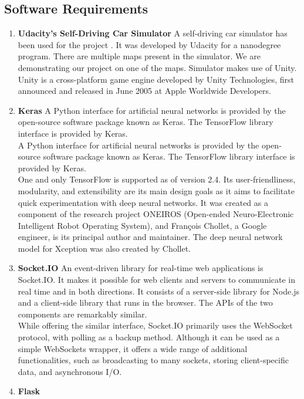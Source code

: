\documentclass[ 12pt,a4paper,twocolumn,fleqn]{article}
\begin{document}
\subsection{Software Requirements}
\begin{enumerate}
    \item \textbf{Udacity's Self-Driving Car Simulator}
    A self-driving car simulator has been used for the project .  It was developed by Udacity for a nanodegree program. There are multiple maps present in the simulator. We are demonstrating our project on one of the maps. Simulator makes use of Unity.\\
    Unity is a cross-platform game engine developed by Unity Technologies, first announced and released in June 2005 at Apple Worldwide Developers. 
    \item \textbf{Keras} 
    A Python interface for artificial neural networks is provided by the open-source software package known as Keras. The TensorFlow library interface is provided by Keras.\\
    A Python interface for artificial neural networks is provided by the open-source software package known as Keras. The TensorFlow library interface is provided by Keras.\\
    One and only TensorFlow is supported as of version 2.4. Its user-friendliness, modularity, and extensibility are its main design goals as it aims to facilitate quick experimentation with deep neural networks. It was created as a component of the research project ONEIROS (Open-ended Neuro-Electronic Intelligent Robot Operating System), and François Chollet, a Google engineer, is its principal author and maintainer. The deep neural network model for Xception was also created by Chollet.
    \item \textbf{Socket.IO}
    An event-driven library for real-time web applications is Socket.IO. It makes it possible for web clients and servers to communicate in real time and in both directions. It consists of a server-side library for Node.js and a client-side library that runs in the browser. The APIs of the two components are remarkably similar.\\
    While offering the similar interface, Socket.IO primarily uses the WebSocket protocol, with polling as a backup method. Although it can be used as a simple WebSockets wrapper, it offers a wide range of additional functionalities, such as broadcasting to many sockets, storing client-specific data, and asynchronous I/O.
    \item \textbf{Flask}

\end{enumerate}
\end{document}
